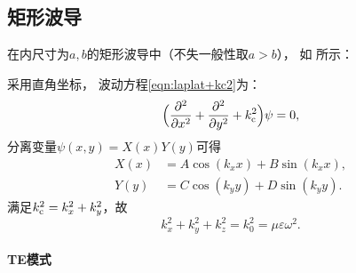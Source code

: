 \subsection{矩形波导}
\label{ssec:rectangular waveguide}

在内尺寸为$a,b$的矩形波导中（不失一般性取$a > b$），
如 所示：
\begin{notecaptionblock}
    \label{fig:rectangle waveguide}
\end{notecaptionblock}
采用直角坐标，
波动方程\eqref{eqn:laplat+kc2}为：
\begin{equation}
    \Bigp{\pp[2]x + \pp[2]y + k_\cutoff^2}\psi = 0,
\end{equation}
分离变量$\psi(x,y) = X(x)Y(y)$可得
\begin{align*}
    X(x) &= A\cos(k_xx) + B\sin(k_xx),\\
    Y(y) &= C\cos(k_yy) + D\sin(k_yy).
\end{align*}
满足$k_\cutoff^2 = k_x^2 + k_y^2$，故
\begin{equation}
    k_x^2 + k_y^2 + k_z^2 = k_0^2 = \mu\varepsilon\omega^2.
\end{equation}

\paragraph{TE模式}

